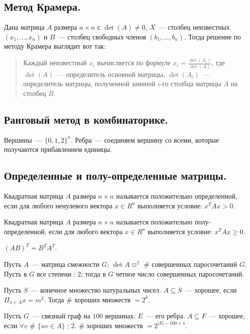 \documentclass{article}
\begin{document}
	\subsection{Метод Крамера.}
	\begin{method}[Крамера]
		Дана матрица $A$ размера $n \times n$ с $\det(A) \not= 0$, $X$~--- столбец неизвестных $(x_1, \dots, x_n)$ и $B$~--- столбец свободных членов $(b_1, \dots, b_n)$. Тогда решение по методу Крамера выглядит вот так:
		\begin{quote}
			Каждый неизвестный $x_i$ вычисляется по формуле $x_i = \frac{\det(A_i)}{\det(A)}$, где $\det(A)$~--- определитель основной матрицы, $\det(A_i)$~--- определитель матрицы, полученной заменой $i$-го столбца матрицы $A$ на столбец $B$.
		\end{quote}
	\end{method}
	\subsection{Ранговый метод в комбинаторике.}
	Вершины~--- $\{ 0, 1, 2 \}^n$. Ребра~--- соединяем вершину со всеми, которые получаются прибавлением единицы.
	\subsection{Определенные и полу-определенные матрицы.}
	\begin{definition}
		Квадратная матрица $A$ размера $n \times n$ называется положительно определенной, если для любого ненулевого вектора $x \in R^n$ выполняется условие: $x^T A x > 0$.
	\end{definition}
	\begin{definition}
		Квадратная матрица $A$ размера $n \times n$ называется положительно полу-определенной, если для любого вектора $x \in R^n$ выполняется условие: $x^T A x \geqslant 0$.
	\end{definition}
	\begin{statement}
		$(AB)^T=B^TA^T$.
	\end{statement}
	\begin{statement}
		Пусть $A$~--- матрица смежности $G$; $\det A \equiv^2$ \# совершенных паросочетаний $G$. \\
		Пусть в $G$ все степени $\vdots$ $2$; тогда в $G$ четное число совершенных паросочетаний.
	\end{statement}
	\begin{statement}
		Пусть $S$~--- конечное множество натуральных чисел. $A \subseteq S$~--- хорошее, если $\Pi_{x \in A} x = m^2$. Тогда \# хороших множеств $= 2^k$.
	\end{statement}
	\begin{statement}
		Пусть $G$~--- связный граф на $100$ вершинах. $E$~--- его ребра. $A \subseteq F$~--- хорошее, если $\forall v$ \# $\{ uv \in A \}$ $\vdots$ $2$. \# хороших множеств $= 2^{|E| - 100 + 1}$.
	\end{statement}
	
\end{document}
